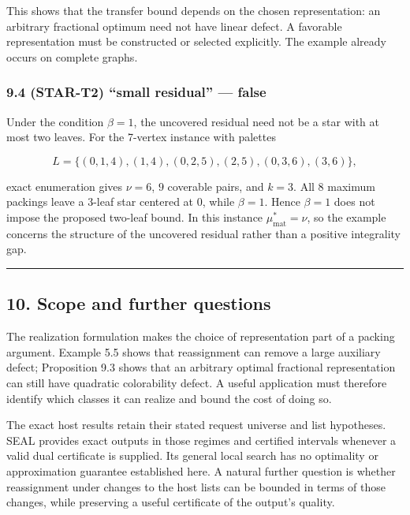 \documentclass[english,11pt,a4paper]{article}
\begin{document}
This shows that the transfer bound depends on the chosen representation:
an arbitrary fractional optimum need not have linear defect. A favorable
representation must be constructed or selected explicitly. The example
already occurs on complete graphs.

\subsubsection{9.4 (STAR-T2) ``small residual'' ---
false}\label{star-t2-small-residual-false}

Under the condition \(\beta=1\), the uncovered residual need not be a
star with at most two leaves. For the 7-vertex instance with palettes

\[
L=\{(0,1,4),(1,4),(0,2,5),(2,5),(0,3,6),(3,6)\},
\]

exact enumeration gives \(\nu=6\), \(9\) coverable pairs, and \(k=3\).
All \(8\) maximum packings leave a \(3\)-leaf star centered at \(0\),
while \(\beta=1\). Hence \(\beta=1\) does not impose the proposed
two-leaf bound. In this instance \(\mu^*_{\mathrm{mat}}=\nu\), so the
example concerns the structure of the uncovered residual rather than a
positive integrality gap.

\begin{center}\rule{0.5\linewidth}{0.5pt}\end{center}

\subsection{10. Scope and further
questions}\label{scope-and-further-questions}

The realization formulation makes the choice of representation part of a
packing argument. Example 5.5 shows that reassignment can remove a large
auxiliary defect; Proposition 9.3 shows that an arbitrary optimal
fractional representation can still have quadratic colorability defect.
A useful application must therefore identify which classes it can
realize and bound the cost of doing so.

The exact host results retain their stated request universe and list
hypotheses. SEAL provides exact outputs in those regimes and certified
intervals whenever a valid dual certificate is supplied. Its general
local search has no optimality or approximation guarantee established
here. A natural further question is whether reassignment under changes
to the host lists can be bounded in terms of those changes, while
preserving a useful certificate of the output's quality.
\end{document}
